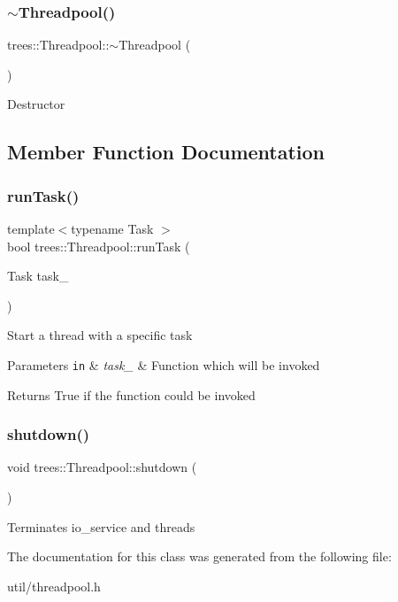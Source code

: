 \subsubsection{\texorpdfstring{$\sim$\+Threadpool()}{~Threadpool()}}
{\footnotesize\ttfamily trees\+::\+Threadpool\+::$\sim$\+Threadpool (\begin{DoxyParamCaption}{ }\end{DoxyParamCaption})\hspace{0.3cm}{\ttfamily [inline]}}

Destructor 

\subsection{Member Function Documentation}
\mbox{\label{classtrees_1_1_threadpool_a5aa569f51cc6095e8017500c7e6b074d}} 
\subsubsection{\texorpdfstring{run\+Task()}{runTask()}}
{\footnotesize\ttfamily template$<$typename Task $>$ \\
bool trees\+::\+Threadpool\+::run\+Task (\begin{DoxyParamCaption}\item[{Task}]{task\+\_\+ }\end{DoxyParamCaption})\hspace{0.3cm}{\ttfamily [inline]}}

Start a thread with a specific task


\begin{DoxyParams}[1]{Parameters}
\mbox{\tt in}  & {\em task\+\_\+} & Function which will be invoked \\
\hline
\end{DoxyParams}
\begin{DoxyReturn}{Returns}
True if the function could be invoked 
\end{DoxyReturn}
\mbox{\label{classtrees_1_1_threadpool_a3d6488b730cc53472239f9c74e384d64}} 
\subsubsection{\texorpdfstring{shutdown()}{shutdown()}}
{\footnotesize\ttfamily void trees\+::\+Threadpool\+::shutdown (\begin{DoxyParamCaption}{ }\end{DoxyParamCaption})\hspace{0.3cm}{\ttfamily [inline]}}

Terminates io\+\_\+service and threads 

The documentation for this class was generated from the following file\+:\begin{DoxyCompactItemize}
\item 
util/threadpool.\+h\end{DoxyCompactItemize}
